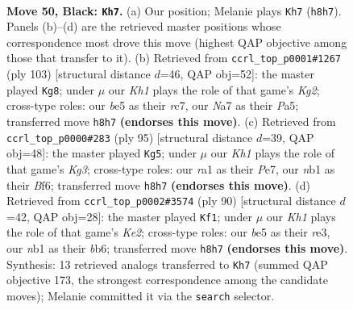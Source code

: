 \documentclass[11pt]{article}
\begin{document}
\clearpage

\begin{figure}[p]\centering
\begin{subfigure}{0.46\textwidth}\centering
\resizebox{\linewidth}{!}{%
\newchessgame
\chessboard[
  setfen={5K1k/n1P5/p7/P3Bp1p/4p3/5bP1/8/RN1r4 b - - 7 50},
  showmover=false,
  pgfstyle=straightmove, color=movearrow, markmove={h8-h7}
]}
\caption{}
\end{subfigure}\hfill
\begin{subfigure}{0.46\textwidth}\centering
\resizebox{\linewidth}{!}{%
\newchessgame
\chessboard[
  setfen={8/2R3k1/3p2p1/pp1Pb1B1/7P/1P6/P2K4/r7 b - - 8 52},
  showmover=false,
  pgfstyle=straightmove, color=movearrow, markmove={g7-g8}
]}
\caption{}
\end{subfigure}
\\[4pt]
\begin{subfigure}{0.46\textwidth}\centering
\resizebox{\linewidth}{!}{%
\newchessgame
\chessboard[
  setfen={4B3/4p3/3p1bk1/p1pP4/P1P2R2/5P1K/8/r7 b - - 1 48},
  showmover=false,
  pgfstyle=straightmove, color=movearrow, markmove={g6-g5}
]}
\caption{}
\end{subfigure}\hfill
\begin{subfigure}{0.46\textwidth}\centering
\resizebox{\linewidth}{!}{%
\newchessgame
\chessboard[
  setfen={R7/4k2p/1bB1p1p1/1P4P1/7P/4r3/4K3/8 w - - 14 46},
  showmover=false,
  pgfstyle=straightmove, color=movearrow, markmove={e2-f1}
]}
\caption{}
\end{subfigure}
\caption{\textbf{Move 50, Black: \texttt{Kh7}.} (a) Our position; Melanie plays \texttt{Kh7} (\texttt{h8h7}). Panels (b)--(d) are the retrieved master positions whose correspondence most drove this move (highest QAP objective among those that transfer to it). (b) Retrieved from \texttt{ccrl\_top\_p0001\#1267} (ply 103) [structural distance $d$=46, QAP obj=52]: the master played \texttt{Kg8}; under $\mu$ our \emph{Kh1} plays the role of that game's \emph{Kg2}; cross-type roles: our \emph{b}e5 as their \emph{r}c7, our \emph{N}a7 as their \emph{P}a5; transferred move \texttt{h8h7} \textbf{(endorses this move)}. (c) Retrieved from \texttt{ccrl\_top\_p0000\#283} (ply 95) [structural distance $d$=39, QAP obj=48]: the master played \texttt{Kg5}; under $\mu$ our \emph{Kh1} plays the role of that game's \emph{Kg3}; cross-type roles: our \emph{r}a1 as their \emph{P}e7, our \emph{n}b1 as their \emph{B}f6; transferred move \texttt{h8h7} \textbf{(endorses this move)}. (d) Retrieved from \texttt{ccrl\_top\_p0002\#3574} (ply 90) [structural distance $d$=42, QAP obj=28]: the master played \texttt{Kf1}; under $\mu$ our \emph{Kh1} plays the role of that game's \emph{Ke2}; cross-type roles: our \emph{b}e5 as their \emph{r}e3, our \emph{n}b1 as their \emph{b}b6; transferred move \texttt{h8h7} \textbf{(endorses this move)}. Synthesis: 13 retrieved analogs transferred to \texttt{Kh7} (summed QAP objective 173, the strongest correspondence among the candidate moves); Melanie committed it via the \texttt{search} selector.}
\label{fig:thought-m99}
\end{figure}
\end{document}
